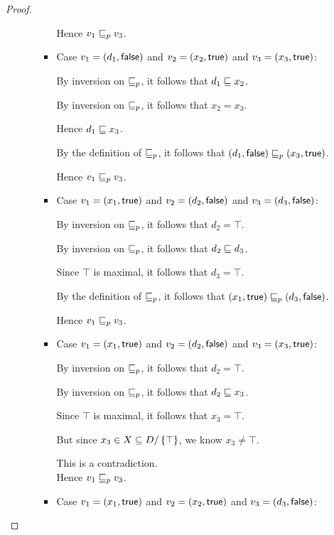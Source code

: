 \begin{proof}
\begin{enumerate}
\begin{enumerate}
\begin{itemize}
        Hence $v_1 \sqsubseteq_p v_3$.

      \item Case $v_1 = (d_1, \textsf{false})$ and $v_2 =
        (x_2, \textsf{true})$ and $v_3 =
        (x_3, \textsf{true})$:

        By inversion on $\sqsubseteq_p$, it follows that $d_1 \sqsubseteq x_2$.

        By inversion on $\sqsubseteq_p$, it follows that $x_2 = x_3$.

        Hence $d_1 \sqsubseteq x_3$.

        By the definition of $\sqsubseteq_p$, it follows that
        $(d_1, \textsf{false}) \sqsubseteq_p (x_3, \textsf{true})$.

        Hence $v_1 \sqsubseteq_p v_3$.

      \item Case $v_1 = (x_1, \textsf{true})$ and $v_2 =
        (d_2, \textsf{false})$ and $v_3 =
        (d_3, \textsf{false})$:

        By inversion on $\sqsubseteq_p$, it follows that $d_2 = \top$.

        By inversion on $\sqsubseteq_p$, it follows that $d_2 \sqsubseteq d_3$.

        Since $\top$ is maximal, it follows that $d_3 = \top$.

        By the definition of $\sqsubseteq_p$, it follows that
        $(x_1, \textsf{true}) \sqsubseteq_p (d_3, \textsf{false})$.

        Hence $v_1 \sqsubseteq_p v_3$. 

      \item Case $v_1 = (x_1, \textsf{true})$ and $v_2 =
        (d_2, \textsf{false})$ and $v_3 =
        (x_3, \textsf{true})$:

        By inversion on $\sqsubseteq_p$, it follows that $d_2 = \top$.

        By inversion on $\sqsubseteq_p$, it follows that $d_2 \sqsubseteq x_3$.

        Since $\top$ is maximal, it follows that $x_3 = \top$.

        But since $x_3 \in X \subseteq D/\left\{\top\right\}$, we know $x_3
        \not= \top$.

        This is a contradiction. \\

        Hence $v_1 \sqsubseteq_p v_3$. 

      \item Case $v_1 = (x_1, \textsf{true})$ and $v_2 =
        (x_2, \textsf{true})$ and $v_3 =
        (d_3, \textsf{false})$:


\end{itemize}
\end{enumerate}
\end{enumerate}
\end{proof}
